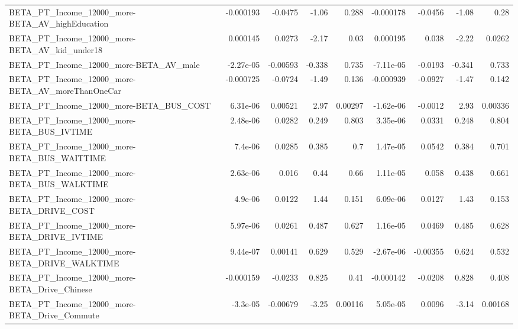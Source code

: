 \begin{tabular}{lrrrrrrrr}
BETA\_PT\_Income\_12000\_more-BETA\_AV\_highEducation    &   -0.000193 &      -0.0475 &    -1.06 &    0.288 &  -0.000178 &     -0.0456 &        -1.08 &          0.28 \\
BETA\_PT\_Income\_12000\_more-BETA\_AV\_kid\_under18      &    0.000145 &       0.0273 &    -2.17 &     0.03 &   0.000195 &       0.038 &        -2.22 &        0.0262 \\
BETA\_PT\_Income\_12000\_more-BETA\_AV\_male             &   -2.27e-05 &     -0.00593 &   -0.338 &    0.735 &  -7.11e-05 &     -0.0193 &       -0.341 &         0.733 \\
BETA\_PT\_Income\_12000\_more-BETA\_AV\_moreThanOneCar   &   -0.000725 &      -0.0724 &    -1.49 &    0.136 &  -0.000939 &     -0.0927 &        -1.47 &         0.142 \\
BETA\_PT\_Income\_12000\_more-BETA\_BUS\_COST            &    6.31e-06 &      0.00521 &     2.97 &  0.00297 &  -1.62e-06 &     -0.0012 &         2.93 &       0.00336 \\
BETA\_PT\_Income\_12000\_more-BETA\_BUS\_IVTIME          &    2.48e-06 &       0.0282 &    0.249 &    0.803 &   3.35e-06 &      0.0331 &        0.248 &         0.804 \\
BETA\_PT\_Income\_12000\_more-BETA\_BUS\_WAITTIME        &     7.4e-06 &       0.0285 &    0.385 &      0.7 &   1.47e-05 &      0.0542 &        0.384 &         0.701 \\
BETA\_PT\_Income\_12000\_more-BETA\_BUS\_WALKTIME        &    2.63e-06 &        0.016 &     0.44 &     0.66 &   1.11e-05 &       0.058 &        0.438 &         0.661 \\
BETA\_PT\_Income\_12000\_more-BETA\_DRIVE\_COST          &     4.9e-06 &       0.0122 &     1.44 &    0.151 &   6.09e-06 &      0.0127 &         1.43 &         0.153 \\
BETA\_PT\_Income\_12000\_more-BETA\_DRIVE\_IVTIME        &    5.97e-06 &       0.0261 &    0.487 &    0.627 &   1.16e-05 &      0.0469 &        0.485 &         0.628 \\
BETA\_PT\_Income\_12000\_more-BETA\_DRIVE\_WALKTIME      &    9.44e-07 &      0.00141 &    0.629 &    0.529 &  -2.67e-06 &    -0.00355 &        0.624 &         0.532 \\
BETA\_PT\_Income\_12000\_more-BETA\_Drive\_Chinese       &   -0.000159 &      -0.0233 &    0.825 &     0.41 &  -0.000142 &     -0.0208 &        0.828 &         0.408 \\
BETA\_PT\_Income\_12000\_more-BETA\_Drive\_Commute       &    -3.3e-05 &     -0.00679 &    -3.25 &  0.00116 &   5.05e-05 &      0.0096 &        -3.14 &       0.00168 \\

\end{tabular}
